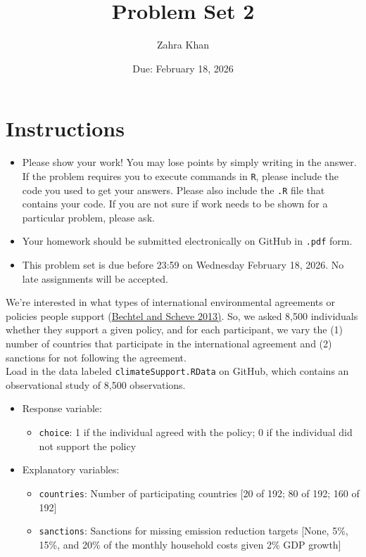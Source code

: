 \documentclass[12pt,letterpaper]{article}
\title{Problem Set 2}
\date{Due: February 18, 2026}
\author{Zahra Khan}
\begin{document}
	\maketitle
	\section*{Instructions}
	\begin{itemize}
		\item Please show your work! You may lose points by simply writing in the answer. If the problem requires you to execute commands in \texttt{R}, please include the code you used to get your answers. Please also include the \texttt{.R} file that contains your code. If you are not sure if work needs to be shown for a particular problem, please ask.
		\item Your homework should be submitted electronically on GitHub in \texttt{.pdf} form.
		\item This problem set is due before 23:59 on Wednesday February 18, 2026. No late assignments will be accepted.

	\end{itemize}

	\vspace{.25cm}

\noindent We're interested in what types of international environmental agreements or policies people support (\href{https://www.pnas.org/content/110/34/13763}{Bechtel and Scheve 2013)}. So, we asked 8,500 individuals whether they support a given policy, and for each participant, we vary the (1) number of countries that participate in the international agreement and (2) sanctions for not following the agreement. \\

\noindent Load in the data labeled \texttt{climateSupport.RData} on GitHub, which contains an observational study of 8,500 observations.

\begin{itemize}
	\item
	Response variable: 
	\begin{itemize}
		\item \texttt{choice}: 1 if the individual agreed with the policy; 0 if the individual did not support the policy
	\end{itemize}
	\item
	Explanatory variables: 
	\begin{itemize}
		\item
		\texttt{countries}: Number of participating countries [20 of 192; 80 of 192; 160 of 192]
		\item
		\texttt{sanctions}: Sanctions for missing emission reduction targets [None, 5\%, 15\%, and 20\% of the monthly household costs given 2\% GDP growth]
		
	\end{itemize}
	
\end{itemize}
\end{document}
